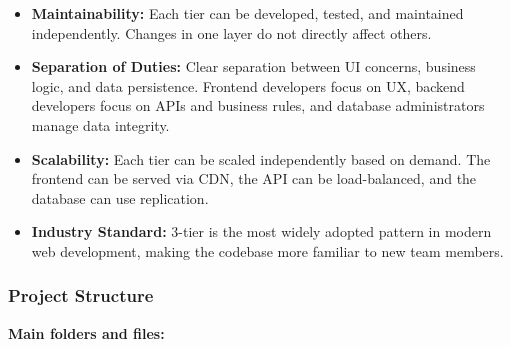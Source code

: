 \documentclass[12pt, a4paper]{article}
\begin{document}
\begin{itemize}
  \item \textbf{Maintainability:} Each tier can be developed, tested, and maintained independently. Changes in one layer do not directly affect others.
  \item \textbf{Separation of Duties:} Clear separation between UI concerns, business logic, and data persistence. Frontend developers focus on UX, backend developers focus on APIs and business rules, and database administrators manage data integrity.
  \item \textbf{Scalability:} Each tier can be scaled independently based on demand. The frontend can be served via CDN, the API can be load-balanced, and the database can use replication.
  \item \textbf{Industry Standard:} 3-tier is the most widely adopted pattern in modern web development, making the codebase more familiar to new team members.
\end{itemize}


\subsubsection{Project Structure}

\textbf{Main folders and files:}
\end{document}

